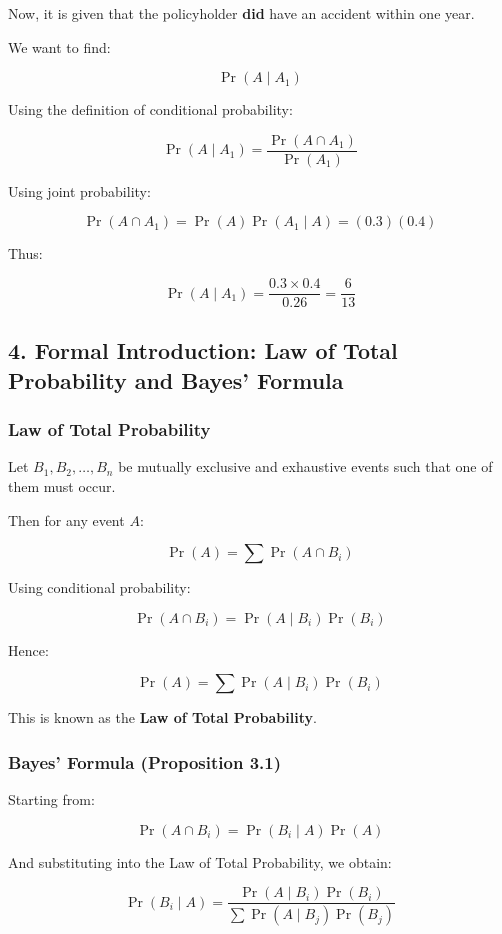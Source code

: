 \documentclass[12pt]{article}
\begin{document}
Now, it is given that the policyholder \textbf{did} have an accident within one year.

We want to find:

\[
\Pr(A \mid A_1)
\]

Using the definition of conditional probability:

\[
\Pr(A \mid A_1) = \frac{\Pr(A \cap A_1)}{\Pr(A_1)}
\]

Using joint probability:

\[
\Pr(A \cap A_1) = \Pr(A)\Pr(A_1 \mid A) = (0.3)(0.4)
\]

Thus:

\[
\Pr(A \mid A_1) = \frac{0.3 \times 0.4}{0.26} = \frac{6}{13}
\]

\hrulefill

\subsection*{4. Formal Introduction: Law of Total Probability and Bayes’ Formula}

\subsubsection*{Law of Total Probability}

Let $B_1, B_2, \ldots, B_n$ be mutually exclusive and exhaustive events such that one of them must occur.

Then for any event $A$:

\[
\Pr(A) = \sum \Pr(A \cap B_i)
\]

Using conditional probability:

\[
\Pr(A \cap B_i) = \Pr(A \mid B_i)\Pr(B_i)
\]

Hence:

\[
\Pr(A) = \sum \Pr(A \mid B_i)\Pr(B_i)
\]

This is known as the \textbf{Law of Total Probability}.

\hrulefill

\subsubsection*{Bayes’ Formula (Proposition 3.1)}

Starting from:

\[
\Pr(A \cap B_i) = \Pr(B_i \mid A)\Pr(A)
\]

And substituting into the Law of Total Probability, we obtain:

\[
\Pr(B_i \mid A) =
\frac{\Pr(A \mid B_i)\Pr(B_i)}
{\sum \Pr(A \mid B_j)\Pr(B_j)}
\]
\end{document}
